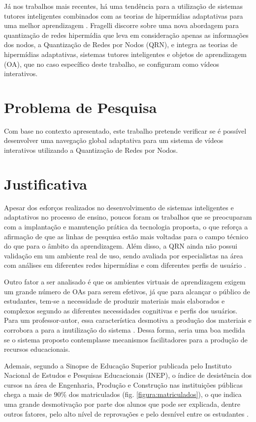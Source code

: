 Já nos trabalhos mais recentes, há uma tendência para a utilização de sistemas tutores inteligentes combinados com as teorias de hipermídias adaptativas para uma melhor aprendizagem \cite{fragelli2010}. Fragelli discorre sobre uma nova abordagem para quantização de redes hipermídia que leva em consideração apenas as informações dos nodos, a Quantização de Redes por Nodos (QRN), e integra as teorias de hipermídias adaptativas, sistemas tutores inteligentes e objetos de aprendizagem (OA), que no caso específico deste trabalho, se configuram como vídeos interativos.

\section[Problema de Pesquisa]{Problema de Pesquisa}

Com base no contexto apresentado, este trabalho pretende verificar se é possível desenvolver uma navegação global adaptativa para um sistema de vídeos interativos utilizando a Quantização de Redes por Nodos.

\section[Justificativa]{Justificativa}

Apesar dos esforços realizados no desenvolvimento de sistemas inteligentes e adaptativos no processo de ensino, poucos foram os trabalhos que se preocuparam com a implantação e manutenção prática da tecnologia proposta, o que reforça a afirmação de que as linhas de pesquisa estão mais voltadas para o campo técnico do que para o âmbito da aprendizagem. Além disso, a QRN ainda não possui validação em um ambiente real de uso, sendo avaliada por especialistas na área com análises em diferentes redes hipermídias e com diferentes perfis de usuário \cite{fragelli2010}.

Outro fator a ser analisado é que os ambientes virtuais de aprendizagem exigem um grande número de OAs para serem efetivos, já que para alcançar o público de estudantes, tem-se a necessidade de produzir materiais mais elaborados e complexos segundo as diferentes necessidades cognitivas e perfis dos usuários. Para um professor-autor, essa característica desmotiva a produção dos materiais e corrobora a para a inutilização do sistema \cite{fragelli2010}. Dessa forma, seria uma boa medida se o sistema proposto contemplasse mecanismos facilitadores para a produção de recursos educacionais.

Ademais, segundo a Sinopse de Educação Superior publicada pelo Instituto Nacional de Estudos e Pesquisas Educacionais (INEP), o índice de desistência dos cursos na área de Engenharia, Produção e Construção nas instituições públicas chega a mais de 90\% dos matriculados (fig.  \ref{figura:matriculados}), o que indica uma grande desmotivação por parte dos alunos que pode ser explicada, dentre outros fatores, pelo alto nível de reprovações e pelo desnível entre os estudantes \cite{silva2005}.

